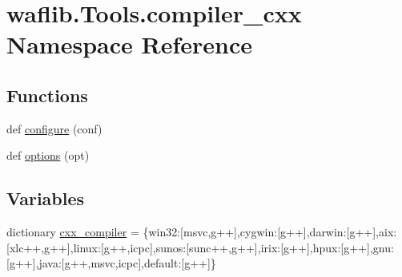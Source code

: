 \hypertarget{namespacewaflib_1_1_tools_1_1compiler__cxx}{}\section{waflib.\+Tools.\+compiler\+\_\+cxx Namespace Reference}
\label{namespacewaflib_1_1_tools_1_1compiler__cxx}
\subsection*{Functions}
\begin{DoxyCompactItemize}
\item 
def \hyperlink{namespacewaflib_1_1_tools_1_1compiler__cxx_a0788b7c415a9fd34ea0f3f575fe60db3}{configure} (conf)
\item 
def \hyperlink{namespacewaflib_1_1_tools_1_1compiler__cxx_a26997eea0edf25e3990533d4011a38e5}{options} (opt)
\end{DoxyCompactItemize}
\subsection*{Variables}
\begin{DoxyCompactItemize}
\item 
dictionary \hyperlink{namespacewaflib_1_1_tools_1_1compiler__cxx_adbc821cfa666db26930d68d7556f1432}{cxx\+\_\+compiler} = \{\textquotesingle{}win32\textquotesingle{}\+:\mbox{[}\textquotesingle{}msvc\textquotesingle{},\textquotesingle{}g++\textquotesingle{}\mbox{]},\textquotesingle{}cygwin\textquotesingle{}\+:\mbox{[}\textquotesingle{}g++\textquotesingle{}\mbox{]},\textquotesingle{}darwin\textquotesingle{}\+:\mbox{[}\textquotesingle{}g++\textquotesingle{}\mbox{]},\textquotesingle{}aix\textquotesingle{}\+:\mbox{[}\textquotesingle{}xlc++\textquotesingle{},\textquotesingle{}g++\textquotesingle{}\mbox{]},\textquotesingle{}linux\textquotesingle{}\+:\mbox{[}\textquotesingle{}g++\textquotesingle{},\textquotesingle{}icpc\textquotesingle{}\mbox{]},\textquotesingle{}sunos\textquotesingle{}\+:\mbox{[}\textquotesingle{}sunc++\textquotesingle{},\textquotesingle{}g++\textquotesingle{}\mbox{]},\textquotesingle{}irix\textquotesingle{}\+:\mbox{[}\textquotesingle{}g++\textquotesingle{}\mbox{]},\textquotesingle{}hpux\textquotesingle{}\+:\mbox{[}\textquotesingle{}g++\textquotesingle{}\mbox{]},\textquotesingle{}gnu\textquotesingle{}\+:\mbox{[}\textquotesingle{}g++\textquotesingle{}\mbox{]},\textquotesingle{}java\textquotesingle{}\+:\mbox{[}\textquotesingle{}g++\textquotesingle{},\textquotesingle{}msvc\textquotesingle{},\textquotesingle{}icpc\textquotesingle{}\mbox{]},\textquotesingle{}default\textquotesingle{}\+:\mbox{[}\textquotesingle{}g++\textquotesingle{}\mbox{]}\}
\end{DoxyCompactItemize}


